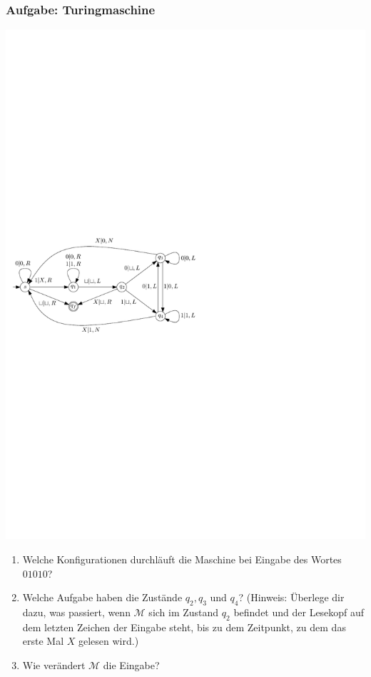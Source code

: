 \begin{frame}
\frametitle{Aufgabe: Turingmaschine}
\vspace{-1cm}
\begin{center}
     \includegraphics[scale=0.7]{images/Uebungsblatt_2_A5}
   \end{center}
   
\begin{enumerate}
 \item Welche Konfigurationen durchläuft die Maschine bei Eingabe des
  Wortes $01010$?

 \item Welche Aufgabe haben die Zustände $q_2, q_3$ und $q_4$? 
       (Hinweis: Überlege dir dazu, was passiert, wenn $\mathcal{M}$ sich im Zustand $q_2$ befindet und der Lesekopf auf dem letzten Zeichen der Eingabe steht, bis zu dem Zeitpunkt, zu dem das erste Mal $X$ gelesen wird.)  

 \item Wie verändert $\mathcal{M}$ die Eingabe?

\end{enumerate}
\end{frame}
